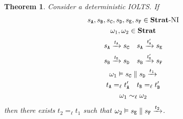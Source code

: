 \documentclass[preprint,5p,twocolumn]{elsarticle}
\newtheorem{theorem}{Theorem}
\begin{document}
\begin{theorem}
  \label{thm:helper deterministic}
  Consider a deterministic IOLTS. If
  \begin{gather*}
    s_{\mathtt{A}}, s_{\mathtt{B}}, s_{\mathtt{C}}, s_{\mathtt{D}}, s_{\mathtt{E}}, s_{\mathtt{F}} \in \mathbf{Strat}\text{-}\mathrm{NI}\\
    \omega_1,\omega_2 \in \mathbf{Strat}\\
    s_{\mathtt{A}} \xrightarrow{t_{\mathtt{A}}} s_{\mathtt{C}} \quad s_{\mathtt{A}} \xrightarrow{t'_{\mathtt{A}}} s_{\mathtt{E}}\\
    s_{\mathtt{B}} \xrightarrow{t_{\mathtt{B}}} s_{\mathtt{D}} \quad s_{\mathtt{B}} \xrightarrow{t'_{\mathtt{B}}} s_{\mathtt{F}}\\
    \omega_1 \vDash s_{\mathtt{C}} \parallel s_{\mathtt{D}} \xrightarrow{t_1} \\
    t_{\mathtt{A}} =_\ell t'_{\mathtt{A}} \quad t_{\mathtt{B}} =_\ell t'_{\mathtt{B}}\\
    \omega_1 \sim_\ell \omega_2
  \end{gather*}
  then there exists $t_2 =_\ell t_1$ such that $\omega_2 \vDash s_{\mathtt{E}} \parallel s_{\mathtt{F}} \xrightarrow{t_2}$.
\end{theorem}
\end{document}
